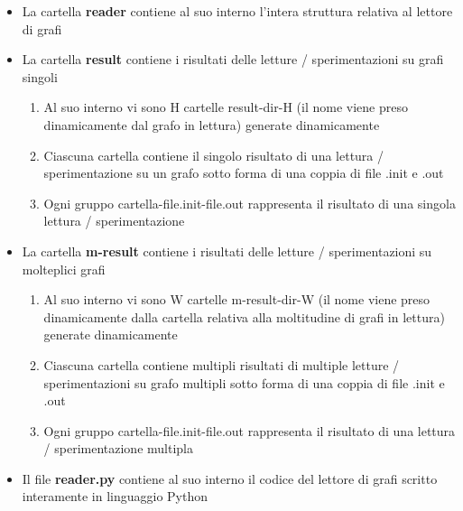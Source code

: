 \begin{itemize}
	\item La cartella \textbf{reader} contiene al suo interno l'intera struttura relativa al lettore di grafi
	\item La cartella \textbf{result} contiene i risultati delle letture / sperimentazioni su grafi singoli
	\begin{enumerate}
		\item Al suo interno vi sono H cartelle result-dir-H (il nome viene preso dinamicamente dal grafo in lettura) generate dinamicamente
		\item Ciascuna cartella contiene il singolo risultato di una lettura / sperimentazione su un grafo sotto forma di una coppia di file .init e .out
		\item Ogni gruppo cartella-file.init-file.out rappresenta il risultato di una singola lettura / sperimentazione 
	\end{enumerate}
	\item La cartella \textbf{m-result} contiene i risultati delle letture / sperimentazioni su molteplici grafi
	\begin{enumerate}
		\item Al suo interno vi sono W cartelle m-result-dir-W (il nome viene preso dinamicamente dalla cartella relativa alla moltitudine di grafi in lettura) generate dinamicamente
		\item Ciascuna cartella contiene multipli risultati di multiple letture / sperimentazioni su grafo multipli sotto forma di una coppia di file .init e .out
		\item Ogni gruppo cartella-file.init-file.out rappresenta il risultato di una lettura / sperimentazione multipla
	\end{enumerate}
	\item Il file \textbf{reader.py} contiene al suo interno il codice del lettore di grafi scritto interamente in linguaggio Python 
\end{itemize}

\newpage
{}

